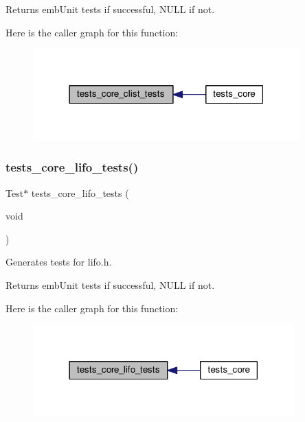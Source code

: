\begin{DoxyReturn}{Returns}
emb\+Unit tests if successful, N\+U\+LL if not. 
\end{DoxyReturn}
Here is the caller graph for this function\+:
\nopagebreak
\begin{figure}[H]
\begin{center}
\leavevmode
\includegraphics[width=291pt]{group__unittests_gac88d9e2710f9a1471a063c472ba78310_icgraph}
\end{center}
\end{figure}
\mbox{\label{group__unittests_ga00403c34e425101181fbebfe68dc0e33}} 
\subsubsection{\texorpdfstring{tests\+\_\+core\+\_\+lifo\+\_\+tests()}{tests\_core\_lifo\_tests()}}
{\footnotesize\ttfamily Test$\ast$ tests\+\_\+core\+\_\+lifo\+\_\+tests (\begin{DoxyParamCaption}\item[{void}]{ }\end{DoxyParamCaption})}



Generates tests for lifo.\+h. 

\begin{DoxyReturn}{Returns}
emb\+Unit tests if successful, N\+U\+LL if not. 
\end{DoxyReturn}
Here is the caller graph for this function\+:
\nopagebreak
\begin{figure}[H]
\begin{center}
\leavevmode
\includegraphics[width=285pt]{group__unittests_ga00403c34e425101181fbebfe68dc0e33_icgraph}
\end{center}
\end{figure}
\mbox{\label{group__unittests_gac59771a00b4ae805ba06afd6e93578cb}} 
